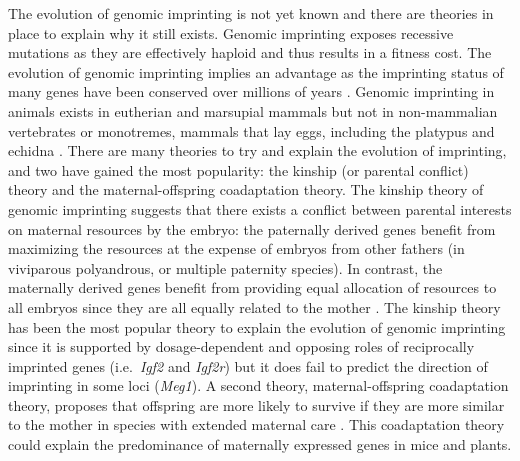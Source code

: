The evolution of genomic imprinting is not yet known and there are theories in place to explain why it still exists. Genomic imprinting exposes recessive mutations as they are effectively haploid and thus results in a fitness cost. The evolution of genomic imprinting implies an advantage as the imprinting status of many genes have been conserved over millions of years \citep{Morison2005,Pires2014}. Genomic imprinting in animals exists in eutherian and marsupial mammals but not in non-mammalian vertebrates or monotremes, mammals that lay eggs, including the platypus and echidna \citep{Jirtle:2007jm,Pires2014}. There are many theories to try and explain the evolution of imprinting, and two have gained the most popularity: the kinship (or parental conflict) theory and the maternal-offspring coadaptation theory. The kinship theory of genomic imprinting suggests that there exists a conflict between parental interests on maternal resources by the embryo: the paternally derived genes benefit from maximizing the resources at the expense of embryos from other fathers (in viviparous polyandrous, or multiple paternity species). In contrast, the maternally derived genes benefit from providing equal allocation of resources to all embryos since they are all equally related to the mother \citep{Pires2014}. The kinship theory has been the most popular theory to explain the evolution of genomic imprinting since it is supported by dosage-dependent and opposing roles of reciprocally imprinted genes (i.e.~\emph{Igf2} and \emph{Igf2r}) but it does fail to predict the direction of imprinting in some loci (\emph{Meg1}). A second theory, maternal-offspring coadaptation theory, proposes that offspring are more likely to survive if they are more similar to the mother in species with extended maternal care \citep{Pires2014}. This coadaptation theory could explain the predominance of maternally expressed genes in mice and plants. 

